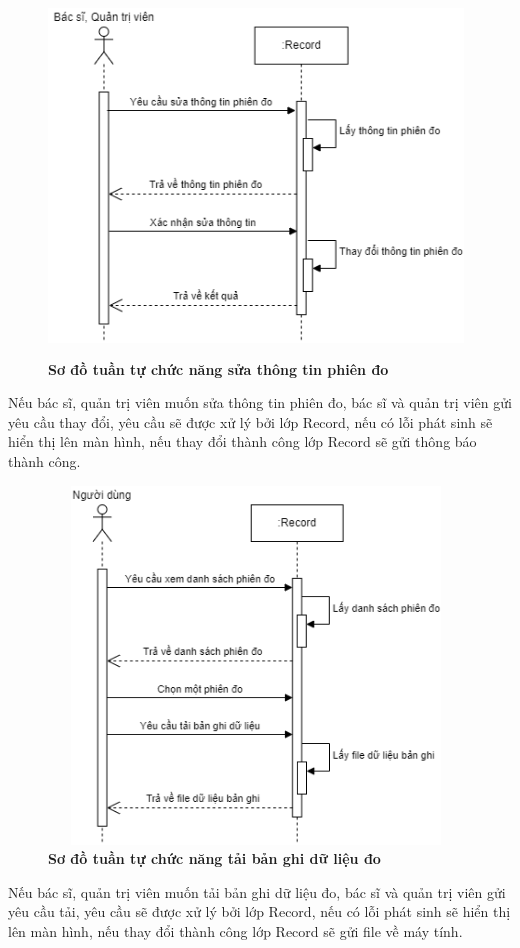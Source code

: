 \begin{figure}[H]
  \centering
  \includegraphics[width=11cm,height=9.5cm]{Images/sequence/sequence_manage_edit_record.png}
  \caption[Sơ đồ tuần tự chức năng sửa thông tin phiên đo]{\bfseries \fontsize{12pt}{0pt}
  \selectfont Sơ đồ tuần tự chức năng sửa thông tin phiên đo}
  \label{sequence_edit_record} %
\end{figure}
Nếu bác sĩ, quản trị viên muốn sửa thông tin phiên đo, bác sĩ và quản trị viên gửi yêu cầu thay đổi, yêu cầu sẽ được xử lý bởi lớp Record, 
nếu có lỗi phát sinh sẽ hiển thị lên màn hình, nếu thay đổi thành công lớp Record sẽ gửi thông báo thành công. 

\begin{figure}[H]
  \centering
  \includegraphics[width=11cm,height=9.5cm]{Images/sequence/sequence_download_records.png}
  \caption[Sơ đồ tuần tự chức năng tải bản ghi dữ liệu đo]{\bfseries \fontsize{12pt}{0pt}
  \selectfont Sơ đồ tuần tự chức năng tải bản ghi dữ liệu đo}
  \label{sequence_download_record} %
\end{figure}
Nếu bác sĩ, quản trị viên muốn tải bản ghi dữ liệu đo, bác sĩ và quản trị viên gửi yêu cầu tải, yêu cầu sẽ được xử lý bởi lớp Record, 
nếu có lỗi phát sinh sẽ hiển thị lên màn hình, nếu thay đổi thành công lớp Record sẽ gửi file về máy tính. 
